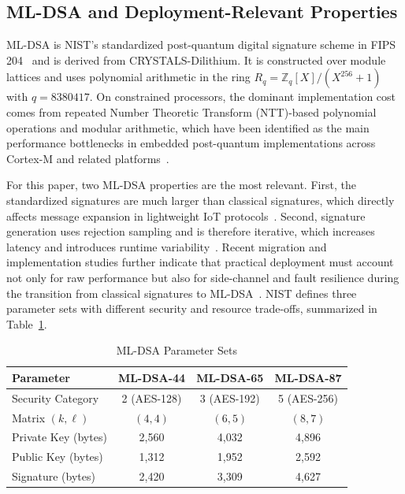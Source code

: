 \documentclass[final, twoside]{IEEEtran} %
\begin{document}
\subsection{ML-DSA and Deployment-Relevant Properties}\label{sec:complexity}

ML-DSA is NIST's standardized post-quantum digital signature scheme in FIPS 204~\cite{NIST-FIPS-204} and is derived from CRYSTALS-Dilithium. It is constructed over module lattices and uses polynomial arithmetic in the ring $R_q = \mathbb{Z}_q[X]/(X^{256}+1)$ with $q = 8380417$. On constrained processors, the dominant implementation cost comes from repeated Number Theoretic Transform (NTT)-based polynomial operations and modular arithmetic, which have been identified as the main performance bottlenecks in embedded post-quantum implementations across Cortex-M and related platforms~\cite{Benchmark2022,pqm4-benchmarks,Barrett2023,Wei2025}.

For this paper, two ML-DSA properties are the most relevant. First, the standardized signatures are much larger than classical signatures, which directly affects message expansion in lightweight IoT protocols~\cite{NIST-FIPS-204}. Second, signature generation uses rejection sampling and is therefore iterative, which increases latency and introduces runtime variability~\cite{NIST-FIPS-204}. Recent migration and implementation studies further indicate that practical deployment must account not only for raw performance but also for side-channel and fault resilience during the transition from classical signatures to ML-DSA~\cite{Li2024,Dinu2025}. NIST defines three parameter sets with different security and resource trade-offs, summarized in Table~\ref{tab:mldsa-params}.

\begin{table}[h]
	\centering
	\caption{ML-DSA Parameter Sets}
	\label{tab:mldsa-params}
	\begin{tabular}{lccc}
		\toprule
		\textbf{Parameter}  & \textbf{ML-DSA-44} & \textbf{ML-DSA-65} & \textbf{ML-DSA-87} \\
		\midrule
		Security Category   & 2 (AES-128)        & 3 (AES-192)        & 5 (AES-256)        \\
		Matrix $(k,\ell)$   & $(4,4)$            & $(6,5)$            & $(8,7)$            \\
		Private Key (bytes) & 2,560              & 4,032              & 4,896              \\
		Public Key (bytes)  & 1,312              & 1,952              & 2,592              \\
		Signature (bytes)   & 2,420              & 3,309              & 4,627              \\
		\bottomrule
	\end{tabular}
\end{table}
\end{document}
